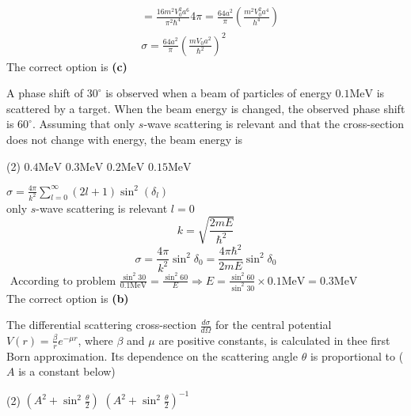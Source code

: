 \begin{enumerate}
\begin{answer}
	\begin{align*}
		&=\frac{16 m^{2} V_{0}^{2} a^{6}}{\pi^{2} \hbar^{4}} 4 \pi=\frac{64 a^{2}}{\pi}\left(\frac{m^{2} V_{0}^{2} a^{4}}{h^{4}}\right) \\
		&\sigma=\frac{64 a^{2}}{\pi}\left(\frac{m V_{0} a^{2}}{\hbar^{2}}\right)^{2}
	\end{align*}
	The correct option is \textbf{(c)}
\end{answer}
\begin{minipage}{\textwidth}
	\item A phase shift of $30^{\circ}$ is observed when a beam of particles of energy $0.1 \mathrm{MeV}$ is scattered by a target. When the beam energy is changed, the observed phase shift is $60^{\circ}$. Assuming that only $s$-wave scattering is relevant and that the cross-section does not change with energy, the beam energy is
\end{minipage}
\begin{tasks}(2)
	\task[\textbf{A.}] $0.4 \mathrm{MeV}$
	\task[\textbf{B.}]$0.3 \mathrm{MeV}$
	\task[\textbf{C.}]$0.2 \mathrm{MeV}$
	\task[\textbf{D.}]$0.15 \mathrm{MeV}$
\end{tasks}
\begin{answer}
	$\sigma=\frac{4 \pi}{k^{2}} \sum_{l=0}^{\infty}(2 l+1) \sin ^{2}\left(\delta_{l}\right)$\\
	only $s$-wave scattering is relevant $l=0$
	$$
	k=\sqrt{\frac{2 m E}{\hbar^{2}}}
	$$
	$$\sigma=\frac{4 \pi}{k^{2}} \sin ^{2} \delta_{0}=\frac{4 \pi \hbar^{2}}{2 m E} \sin ^{2} \delta_{0}$$
	$\text { According to problem } \frac{\sin ^{2} 30}{0.1 \mathrm{MeV}}=\frac{\sin ^{2} 60}{E} \Rightarrow E=\frac{\sin ^{2} 60}{\sin ^{2} 30} \times 0.1 \mathrm{MeV}=0.3 \mathrm{MeV}$\\
	The correct option is \textbf{(b)}
\end{answer}
\begin{minipage}{\textwidth}
	\item The differential scattering cross-section $\frac{d \sigma}{d \Omega}$ for the central potential $V(r)=\frac{\beta}{r} e^{-\mu r}$, where $\beta$ and $\mu$ are positive constants, is calculated in thee first Born approximation. Its dependence on the scattering angle $\theta$ is proportional to ( $A$ is a constant below)
\end{minipage}
\begin{tasks}(2)
	\task[\textbf{A.}] $\left(A^{2}+\sin ^{2} \frac{\theta}{2}\right)$
	\task[\textbf{B.}]$\left(A^{2}+\sin ^{2} \frac{\theta}{2}\right)^{-1}$

\end{tasks}
\end{enumerate}
